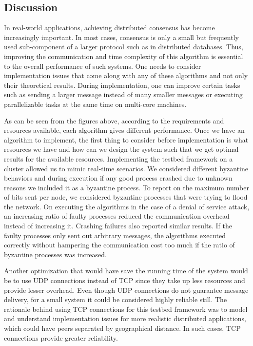 \subsection{Discussion}

In real-world applications, achieving distributed consensus has become increasingly important. In most cases, consensus is only a small but frequently used sub-component of a larger protocol such as in distributed databases. Thus, improving the communication and time complexity of this algorithm is essential to the overall performance of such systems. One needs to consider implementation issues that come along with any of these algorithms and not only their theoretical results. During implementation, one can improve certain tasks such as sending a larger message instead of many smaller messages or executing parallelizable tasks at the same time on multi-core machines.  

As can be seen from the figures above, according to the requirements and resources available, each algorithm gives different performance. Once we have an algorithm to implement, the first thing to consider before implementation is what resources we have and how can we design the system such that we get optimal results for the available resources. Implementing the testbed framework on a cluster allowed us to mimic real-time scenarios. We considered different byzantine behaviors and during execution if any good process crashed due to unknown reasons we included it as a byzantine process. To report on the maximum number of bits sent per node, we considered byzantine processes that were trying to flood the network. On executing the algorithms in the case of a denial of service attack, an increasing ratio of faulty processes reduced the communication overhead instead of increasing it. Crashing failures also reported similar results. If the faulty processes only sent out arbitrary messages, the algorithms executed correctly without hampering the communication cost too much if the ratio of byzantine processes was increased.

Another optimization that would have save the running time of the system would be to use UDP connections instead of TCP since they take up less resources and provide lesser overhead. Even though UDP connections do not guarantee message delivery, for a small system it could be considered highly reliable still. The rationale behind using TCP connections for this testbed framework was to model and understand implementation issues for more realistic distributed applications, which could have peers separated by geographical distance. In such cases, TCP connections provide greater reliability. 

